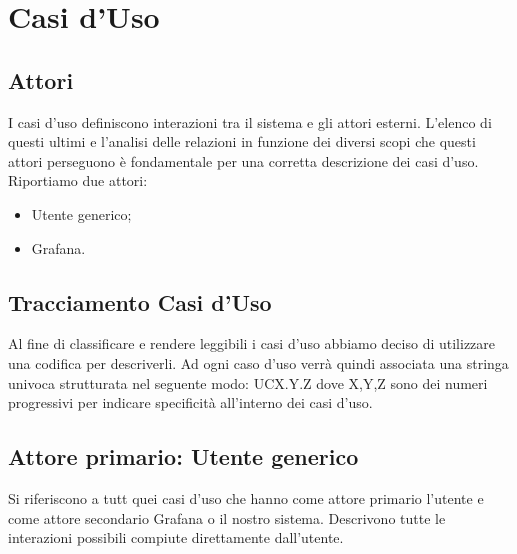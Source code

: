 \section{Casi d'Uso}
		\subsection{Attori}			
        I casi d'uso definiscono interazioni tra il sistema e gli attori esterni. L'elenco di questi ultimi e l'analisi delle relazioni in funzione dei diversi scopi che questi attori perseguono è fondamentale per una corretta descrizione dei casi d'uso.
        Riportiamo due attori:
        \begin{itemize}
            \item Utente generico;
            \item Grafana.
        \end{itemize}


		\subsection{Tracciamento Casi d'Uso}
        Al fine di classificare e rendere leggibili i casi d'uso abbiamo deciso di utilizzare una codifica per descriverli. Ad ogni caso d'uso verrà quindi associata una stringa univoca strutturata nel seguente modo: UCX.Y.Z  dove X,Y,Z sono dei numeri progressivi per indicare specificità all'interno dei casi d'uso.

		\subsection{Attore primario: Utente generico}
		Si riferiscono a tutt quei casi d'uso che hanno come attore primario l'utente e come attore secondario Grafana o il nostro sistema. Descrivono tutte le interazioni possibili compiute direttamente dall'utente.
		
